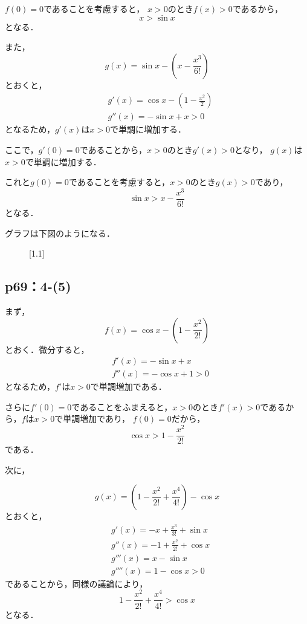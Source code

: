 \documentclass[uplatex,dvipdfmx,a4paper,10pt,fleqn]{jsarticle}
\begin{document}
$f(0)=0$であることを考慮すると，
$x>0$のとき$f(x)>0$であるから，
\[
    x>\sin x
\]
となる．

また，
\[
    g(x)=\sin x - \left ( x-\frac{x^3}{6!} \right)
\]
とおくと，
\begin{align*}
    &g'(x)= \cos x -\left  (1-\frac{x^2}{2} \right) \\
    &g''(x)= -\sin x +x >0
\end{align*}
となるため，$g'(x)$は$x>0$で単調に増加する．

ここで，$g'(0)=0$であることから，$x>0$のとき$g'(x) >0$となり，
$g(x)$は$x>0$で単調に増加する．

これと$g(0)=0$であることを考慮すると，$x>0$のとき$g(x)>0$であり，
\[
    \sin x > x-\frac{x^3}{6!} 
\]
となる．

グラフは下図のようになる．
    \begin{figure}[htbp]
\scalebox{1.1}[1.1]{
 }
\end{figure}


\subsection*{p69：4-(5)}

まず，
\[
    f(x)= \cos x - \left ( 1-\frac{x^2}{2!} \right)
\]
とおく．微分すると，
\begin{align*}
   &  f'(x)= -\sin x +x \\
   & f''(x) = -\cos x +1 >0
\end{align*}
となるため，$f'$は$x>0$で単調増加である．

さらに$f'(0)=0$であることをふまえると，$x>0$のとき$f'(x)>0$であるから，$f$は$x>0$で単調増加であり，
$f(0)=0$だから，
\[
    \cos x > 1-\frac{x^2}{2!} 
\]
である．

次に，

\[
    g(x)= \left ( 1-\frac{x^2}{2!} + \frac{x^4}{4!} \right) - \cos x
\]
とおくと，
\begin{align*} 
    & g'(x)= -x + \frac{x^3}{3!} + \sin x \\
    & g''(x) = -1 + \frac{x^2}{2!} + \cos x \\
    & g'''(x) = x -\sin x \\
    & g''''(x)= 1 -\cos x >0
\end{align*} 
であることから，同様の議論により，
\[
     1-\frac{x^2}{2!} + \frac{x^4}{4!} >\cos x
\]
となる．
\end{document}
